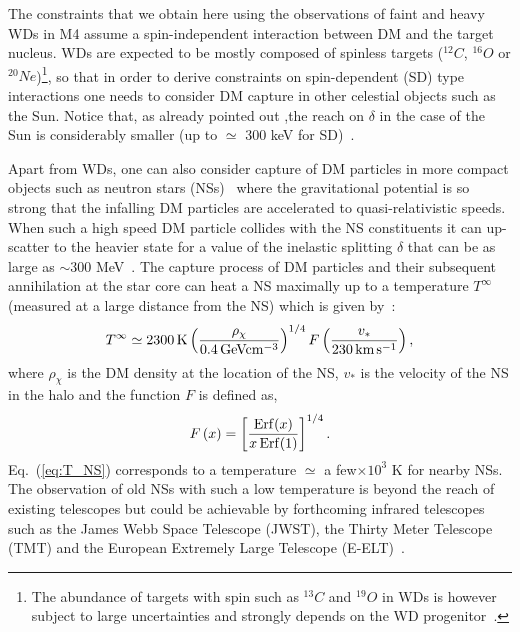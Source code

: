 \documentclass[11pt]{article}
\begin{document}
The constraints that we obtain here using the observations of faint and heavy WDs in M4 assume a spin-independent interaction between DM and the target nucleus. WDs are expected to be mostly composed of spinless targets ($^{12}C$, $^{16}O$ or $^{20}Ne$)\footnote{The abundance of targets with spin such as $^{13}C$ and $^{19}O$ in WDs is however subject to large uncertainties and strongly depends on the WD progenitor~\cite{C13_in_WD_2011}.}, so that in order to derive constraints on spin-dependent (SD) type interactions one needs to consider DM capture in other celestial objects such as the Sun. Notice that, as already pointed out ,the reach on $\delta$ in the case of the Sun is considerably smaller (up to $\simeq$ 300 keV for SD)~\cite{idm_sun_Shu_2010, idm_sun_Catena_2018}. 



Apart from WDs, one can also consider capture of DM particles in more compact objects 
such as neutron stars (NSs)~\cite{IDM_neutron_stars_Kouvaris2007, IDM_neutron_stars_2018, improved_neutron_stars_2020, IDM_neutron_stars_2022} 
where the gravitational potential is so strong that the infalling DM particles are accelerated to quasi-relativistic speeds. When such a high speed DM particle collides with the NS constituents it
can up-scatter to the heavier state for a value of the inelastic splitting $\delta$ 
that can be as large as $\sim 300$ MeV~\cite{IDM_neutron_stars_2018, IDM_neutron_stars_2022}. 
The capture process of DM particles and their subsequent annihilation at the star core can 
heat a NS maximally up to a temperature $T^{\infty}$ (measured at a large distance
from the NS) which is given by~\cite{IDM_neutron_stars_2018, dm_cap_NS_Busoni2021, dm_capture_NS_Chatterjee2022}: 
\begin{equation}
T^{\infty} \simeq 2300 \hspace{0.6mm} {\rm K} 
\left(\frac{\rho_{\chi}}{0.4 \hspace{0.6mm} {\rm GeV cm^{-3}}} \right)^{1/4} 
F \left(\frac{v_*}{230 \hspace{0.6mm} {\rm km \hspace{0.5mm} s^{-1}}} \right) , 
\label{eq:T_NS}
\end{equation}
where $\rho_{\chi}$ is the DM density at the location of the NS, $v_*$ is the velocity of the NS in the halo and the function $F$ is defined as,
\begin{equation}
F \left( x \right) = 
\left[ \frac{{\rm Erf}(x)}{x \hspace{0.6mm} {\rm Erf}(1)} \right]^{1/4} .
\label{eq:err_fn}
\end{equation}
Eq.~(\ref{eq:T_NS}) corresponds to a temperature $\simeq$ a 
few$\times 10^3$ K for nearby NSs. 
The observation of old NSs with such a low temperature is beyond the reach of existing telescopes but could be achievable by forthcoming infrared telescopes such as the James Webb Space Telescope (JWST), the Thirty Meter Telescope (TMT) and the European Extremely Large Telescope (E-ELT)~\cite{NS_infrared_Baryakhtar2017, dm_capture_NS_Chatterjee2022, NS_infrared_PhysRevD.97.043006}. 
\end{document}
